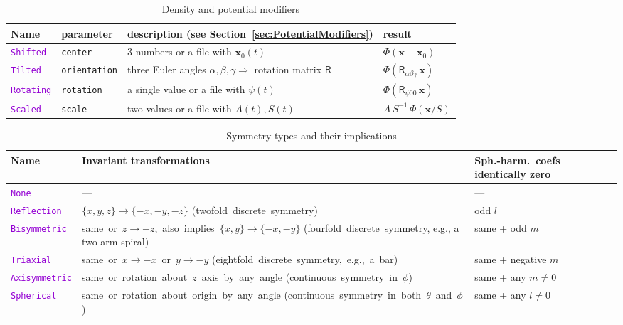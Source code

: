 \documentclass[12pt]{article}
\newcommand{\ttt}[1]{\textcolor{darkviolet}{\texttt{#1}}}
\newcommand{\ppp}[1]{\textcolor{darkolive} {\texttt{#1}}}
\begin{document}
\begin{table}
\caption{Density and potential modifiers}  \label{tab:PotentialModifiers}
\begin{tabular}{l l l l} %
Name & parameter & description (see Section~\ref{sec:PotentialModifiers}) & result \\
\hline
\ttt{Shifted} & \ppp{center} & 3 numbers or a file with $\boldsymbol{x}_0(t)$ & $\Phi(\boldsymbol x-\boldsymbol x_0)$\\
\ttt{Tilted} & \ppp{orientation} & three Euler angles $\alpha,\beta,\gamma\Rightarrow$ rotation matrix $\mathsf{R}$ & $\Phi(\mathsf{R}_{\alpha\beta\gamma}\, \boldsymbol x)$ \\
\ttt{Rotating} & \ppp{rotation} & a single value or a file with $\psi(t)$ & $\Phi(\mathsf{R}_{\psi 0 0}\, \boldsymbol x)$ \\
\ttt{Scaled} & \ppp{scale} & two values or a file with $A(t), S(t)$ & $A\,S^{-1}\,\Phi(\boldsymbol x/S)$
\end{tabular}
\end{table}

\begin{table}
\caption{Symmetry types and their implications}  \label{tab:Symmetry}
\renewcommand{\arraystretch}{1.2}
\begin{tabular}{l m{9.2cm} m{3.5cm}}
Name & Invariant transformations & \mbox{Sph.-harm.~coefs} identically zero \\
\hline
\ttt{None} & --- & --- \\
\ttt{Reflection} & \mbox{$\{x,y,z\} \to \{-x,-y,-z\}$} \mbox{(twofold discrete symmetry)} & odd $l$ \\
\ttt{Bisymmetric} & \mbox{same or $z \to -z$, also implies $\{x,y\} \to \{-x,-y\}$} \mbox{(fourfold discrete symmetry}, e.g., a two-arm spiral) & same + odd $m$ \\
\ttt{Triaxial} & \mbox{same or $x \to -x$ or $y \to -y$} \mbox{(eightfold discrete symmetry, e.g., a bar)} & same + negative $m$ \\
\ttt{Axisymmetric} & \mbox{same or rotation about $z$ axis by any angle} \mbox{(continuous symmetry in $\phi$)} & same + any $m \ne 0$ \\
\ttt{Spherical} & \mbox{same or rotation about origin by any angle} \mbox{(continuous symmetry in both $\theta$ and $\phi$)} & same + any $l \ne 0$
\end{tabular}
\end{table}
\end{document}
